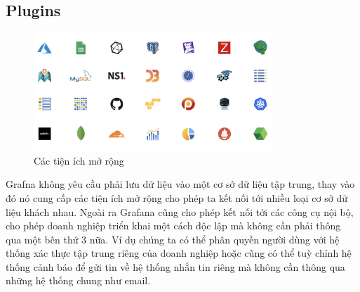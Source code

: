 \subsection{Plugins}
\begin{figure}[H] %
    \centering %
    \includegraphics[width=0.8\textwidth]{figures/grafana_plugins.png} 
    \caption{Các tiện ích mở rộng} %
    \label{fig:fig_01}
\end{figure}
Grafna không yêu cầu phải lưu dữ liệu vào một cơ sở dữ liệu tập trung, thay vào đó nó cung cấp các tiện ích mở rộng cho phép ta kết nối tới nhiều loại cơ sở dữ liệu khách nhau. Ngoài ra Grafana cũng cho phép kết nối tới các công cụ nội bộ, cho phép doanh nghiệp triển khai một cách độc lập mà không cần phải thông qua một bên thứ 3 nữa. Ví dụ chúng ta có thể phân quyền người dùng với hệ thống xác thực tập trung riêng của doanh nghiệp hoặc cũng có thể tuỳ chỉnh hệ thống cảnh báo để gửi tin về hệ thống nhắn tin riêng mà không cần thông qua những hệ thống chung như email.